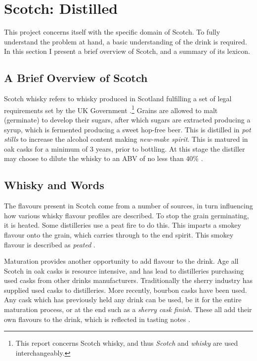 \section{Scotch: Distilled}\label{sec:whisky}
This project concerns itself with the specific domain of Scotch. To fully understand the problem at hand, a basic
understanding of the drink is required.  In this section I present a brief overview of Scotch, 
and a summary of its lexicon.

\subsection{A Brief Overview of Scotch}
Scotch whisky refers to whisky produced in Scotland fulfilling a set of legal requirements set by the UK Government 
\cite{legislation.gov.uk_2009}.\footnote{This report concerns Scotch whisky, and thus \emph{Scotch} and \emph{whisky} 
are used interchangeably.}  Grains are allowed to malt (germinate) to develop their sugars, after which sugars are
extracted producing a syrup, which is fermented producing a sweet hop-free beer.  This is
distilled in \emph{pot stills} to increase the alcohol content making \emph{new-make spirit}. This
is matured in oak casks for a minimum of 3 years, prior to bottling.  At this stage the distiller may choose
to dilute the whisky to an ABV of no less than $40\%$ \cite{Jacques2003, Pyke1965}.

\subsection{Whisky and Words}
The flavours present in Scotch come from a number of sources, in turn influencing how various whisky
flavour profiles are described.  To stop the grain germinating, it is heated. Some distilleries use
a peat fire to do this.  This imparts a smokey flavour onto the grain, which carries through to the end spirit.
This smokey flavour is described as \emph{peated} \cite{Jacques2003, Bathgate2019}.

Maturation provides another opportunity to add flavour to the drink.  Age all Scotch in 
oak casks is resource intensive, and has lead to distilleries purchasing used casks from other drinks manufacturers.
Traditionally the sherry industry has supplied used casks to distilleries. More recently, bourbon casks have been 
used.  Any cask which has previously held any drink can be used, be it for the entire maturation process, or at the end
such as a \emph{sherry cask finish}.  These all add their own flavours to the drink, which is reflected in 
tasting notes \cite{Jacques2003, Mosedale1998}.